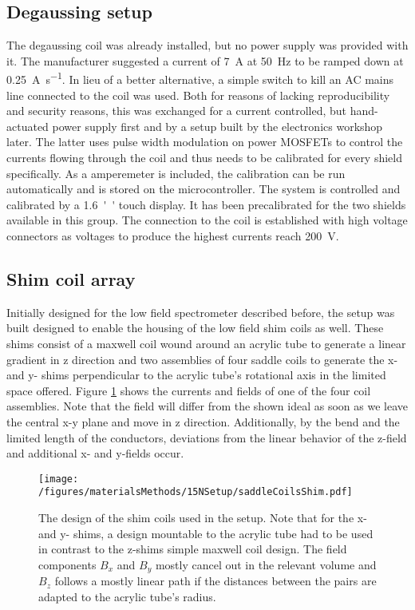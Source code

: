         \subsection{Degaussing setup}
        \label{sec:matMeth:degaussing}
        The degaussing coil was already installed, but no power supply was provided with it. The manufacturer suggested a current of \SI{7}{\ampere} at \SI{50}{\hertz} to be ramped down at \SI{0.25}{\ampere\per\second}. In lieu of a better alternative, a simple switch to kill an AC mains line connected to the coil was used. Both for reasons of lacking reproducibility and security reasons, this was exchanged for a current controlled, but hand-actuated power supply first and by a setup built by the electronics workshop later. The latter uses pulse width modulation on power MOSFETs to control the currents flowing through the coil and thus needs to be calibrated for every shield specifically. As a amperemeter is included, the calibration can be run automatically and is stored on the microcontroller. The system is controlled and calibrated by a \SI{1.6}{''} touch display. It has been precalibrated for the two shields available in this group. The connection to the coil is established with high voltage connectors as voltages to produce the highest currents reach \SI{200}{\volt}.
        \subsection{Shim coil array}
        Initially designed for the low field spectrometer described before, the setup was built designed to enable the housing of the low field shim coils as well. These shims consist of a maxwell coil wound around an acrylic tube to generate a linear gradient in z direction and two assemblies of four saddle coils to generate the x- and y- shims perpendicular to the acrylic tube's rotational axis in the limited space offered.
        Figure \ref{figure:matMeth:shimCoilArray} shows the currents and fields of one of the four coil assemblies. Note that the field will differ from the shown ideal as soon as we leave the central x-y plane and move in z direction. Additionally, by the bend and the limited length of the conductors, deviations from the linear behavior of the z-field and additional x- and y-fields occur.
        \begin{figure}
            \texttt{[image: /figures/materialsMethods/15NSetup/saddleCoilsShim.pdf]}
            \caption[Shim coil design]{The design of the shim coils used in the setup. Note that for the x- and y- shims, a design mountable to the acrylic tube had to be used in contrast to the z-shims simple maxwell coil design. The field components $B_x$ and $B_y$ mostly cancel out in the relevant volume and $B_z$ follows a mostly linear path if the distances between the pairs are adapted to the acrylic tube's radius.}
            \label{figure:matMeth:shimCoilArray}
        \end{figure}
